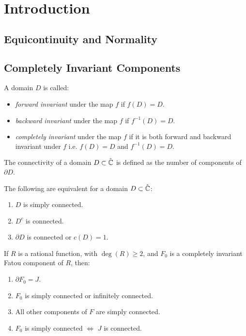 \chapter{Introduction}
\section{Equicontinuity and Normality}

\section{Completely Invariant Components}
A domain \( D \) is called:
\begin{itemize}
	\item \emph{forward invariant} under the map \( f \) if \( f(D)=D \).
	\item \emph{backward invariant} under the map \( f \) if \( f^{-1}(D)=D \).
	\item \emph{completely invariant} under the map \( f \) if it is both forward
		and backward invariant under \( f \) i.e. \( f(D)=D \) and \( f^{-1}(D)=D \).
\end{itemize}

\begin{definition}[Connectivity]
	The connectivity of a domain \( D \subset \hat{\mathbb{C}} \) is defined as the number
	of components of \( \partial D \).
\end{definition}

\begin{theorem}\label{thm1.1}
	The following are equivalent for a domain \( D\subset \hat{\mathbb{C}} \):
	\begin{enumerate}
		\item \( D \) is simply connected.
		\item \( D^c \) is connected.
		\item \( \partial D \) is connected or \( c(D)=1 \).
	\end{enumerate}
\end{theorem}

\begin{theorem}\label{thm1.2}
	If \( R \) is a rational function, with \( \deg(R)\ge 2 \), and \( F_0 \) is
	a completely invariant Fatou component of \( R \), then:
	\begin{enumerate}
		\item \( \partial F_0=J \).
		\item \( F_0 \) is simply connected or infinitely connected.
		\item All other components of \( F \) are simply connected.
		\item \( F_0 \) is simply connected \( \iff \) \( J \) is connected.
	\end{enumerate}
\end{theorem}

